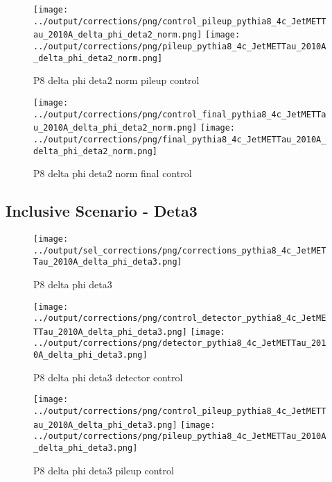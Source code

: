 \documentclass[11pt]{book}
\begin{document}
\begin{figure}[ht]
\centering
\texttt{[image: ../output/corrections/png/control\_pileup\_pythia8\_4c\_JetMETTau\_2010A\_delta\_phi\_deta2\_norm.png]}
\texttt{[image: ../output/corrections/png/pileup\_pythia8\_4c\_JetMETTau\_2010A\_delta\_phi\_deta2\_norm.png]}
\caption{P8 delta phi deta2 norm pileup control}
\label{fig:p8_JetMETTau_2010A_delta_phi_deta2_norm_pileup_control}
\end{figure}


\begin{figure}[ht]
\centering
\texttt{[image: ../output/corrections/png/control\_final\_pythia8\_4c\_JetMETTau\_2010A\_delta\_phi\_deta2\_norm.png]}
\texttt{[image: ../output/corrections/png/final\_pythia8\_4c\_JetMETTau\_2010A\_delta\_phi\_deta2\_norm.png]}
\caption{P8 delta phi deta2 norm final control}
\label{fig:p8_JetMETTau_2010A_delta_phi_deta2_norm_final_control}
\end{figure}


\clearpage
\subsection{Inclusive Scenario - Deta3}
\begin{figure}[ht]
\centering
\texttt{[image: ../output/sel\_corrections/png/corrections\_pythia8\_4c\_JetMETTau\_2010A\_delta\_phi\_deta3.png]}
\caption{P8 delta phi deta3}
\label{fig:p8_JetMETTau_2010A_delta_phi_deta3}
\end{figure}


\begin{figure}[ht]
\centering
\texttt{[image: ../output/corrections/png/control\_detector\_pythia8\_4c\_JetMETTau\_2010A\_delta\_phi\_deta3.png]}
\texttt{[image: ../output/corrections/png/detector\_pythia8\_4c\_JetMETTau\_2010A\_delta\_phi\_deta3.png]}
\caption{P8 delta phi deta3 detector control}
\label{fig:p8_JetMETTau_2010A_delta_phi_deta3_detector_control}
\end{figure}

\begin{figure}[ht]
\centering
\texttt{[image: ../output/corrections/png/control\_pileup\_pythia8\_4c\_JetMETTau\_2010A\_delta\_phi\_deta3.png]}
\texttt{[image: ../output/corrections/png/pileup\_pythia8\_4c\_JetMETTau\_2010A\_delta\_phi\_deta3.png]}
\caption{P8 delta phi deta3 pileup control}
\label{fig:p8_JetMETTau_2010A_delta_phi_deta3_pileup_control}
\end{figure}
\end{document}
